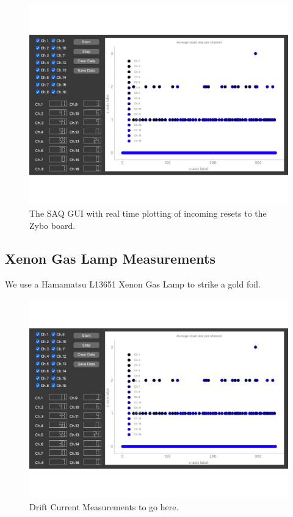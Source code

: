 \begin{figure}[]
\centering
\includegraphics[width=\textwidth]{images/SAQ_gui_resets.pdf}
\caption{The SAQ GUI with real time plotting of incoming resets to the Zybo board.}
\label{fig:saq_gui}
\end{figure}


\subsection{Xenon Gas Lamp Measurements}

We use a Hamamatsu L13651 Xenon Gas Lamp to strike a gold foil.

\begin{figure}[]
\centering
\includegraphics[width=\textwidth]{images/SAQ_gui_resets.pdf}
\caption{Drift Current Measurements to go here.}
\label{fig:saq_drift_gui}
\end{figure}

